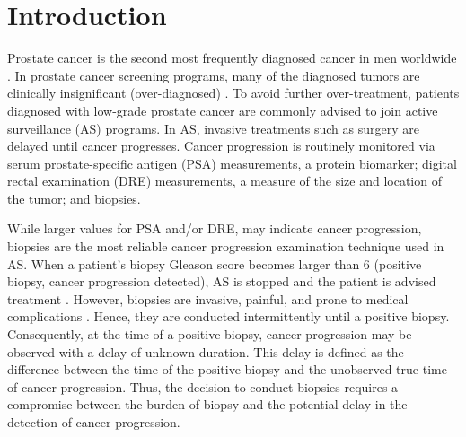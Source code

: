 
\section{Introduction}
\label{sec:introduction}
Prostate cancer is the second most frequently diagnosed cancer in men worldwide \cite{GlobalCancerStats2012}. In prostate cancer screening programs, many of the diagnosed tumors are clinically insignificant (over-diagnosed) \cite{etzioni2002overdiagnosis}. To avoid further over-treatment, patients diagnosed with low-grade prostate cancer are commonly advised to join active surveillance (AS) programs. In AS, invasive treatments such as surgery are delayed until cancer progresses. Cancer progression is routinely monitored via serum prostate-specific antigen (PSA) measurements, a protein biomarker; digital rectal examination (DRE) measurements, a measure of the size and location of the tumor; and biopsies.

While larger values for PSA and/or DRE, may indicate cancer progression, biopsies are the most reliable cancer progression examination technique used in AS. When a patient's biopsy Gleason score becomes larger than 6 (positive biopsy, cancer progression detected), AS is stopped and the patient is advised treatment \cite{bokhorst2015compliance}. However, biopsies are invasive, painful, and prone to medical complications \cite{ehdaie2014impact,fujita2009serial}. Hence, they are conducted intermittently until a positive biopsy. Consequently, at the time of a positive biopsy, cancer progression may be observed with a delay of unknown duration. This delay is defined as the difference between the time of the positive biopsy and the unobserved true time of cancer progression. Thus, the decision to conduct biopsies requires a compromise between the burden of biopsy and the potential delay in the detection of cancer progression.

